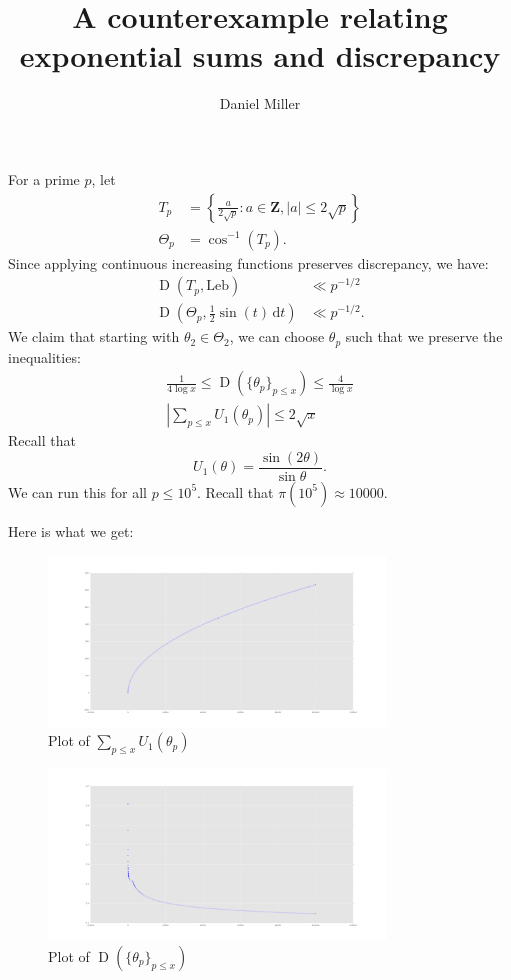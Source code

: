 \documentclass{article}
\title{A counterexample relating exponential sums and discrepancy}
\author{Daniel Miller}
\DeclareMathOperator{\disc}{D}
\newcommand{\bZ}{\mathbf{Z}}
\newcommand{\dd}{\mathrm{d}}
\newcommand{\Leb}{\mathrm{Leb}}
\begin{document}
\maketitle





For a prime $p$, let 
\begin{align*}
	T_p &= \left\{ \frac{a}{2\sqrt p} : a\in \bZ, |a|\leqslant 2\sqrt p\right\} \\
	\Theta_p &= \cos^{-1}\left(T_p \right) .
\end{align*}
Since applying continuous increasing functions preserves discrepancy, we have:
\begin{align*}
	\disc(T_p,\Leb) &\ll p^{-1/2} \\
	\disc\left(\Theta_p, \frac 1 2 \sin(t)\, \dd t\right) &\ll p^{-1/2} .
\end{align*}
We claim that starting with $\theta_2\in \Theta_2$, we can choose 
$\theta_p$ such that we preserve the inequalities:
\begin{align*}
	\frac{1}{4\log x} \leqslant \disc(\{\theta_p\}_{p\leqslant x}) \leqslant \frac{4}{\log x} \\
	\left| \sum_{p\leqslant x} U_1(\theta_p)\right| \leqslant 2 \sqrt{x}
\end{align*}
Recall that 
\[
	U_1(\theta) = \frac{\sin(2\theta)}{\sin\theta} .
\]
We can run this for all $p\leqslant {10}^{5}$. Recall that 
$\pi(10^5) \approx 10000$. 

Here is what we get:
\begin{figure}[ht]
\caption{Plot of $\sum_{p\leqslant x} U_1(\theta_p)$}
\centering
\includegraphics[width=0.8\textwidth]{sums_abs}
\end{figure}

\begin{figure}[ht]
\caption{Plot of $\disc(\{\theta_p\}_{p\leqslant x})$}
\centering
\includegraphics[width=0.8\textwidth]{ks_data}
\end{figure}
\end{document}
